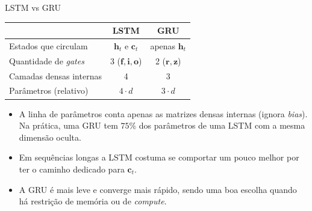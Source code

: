\documentclass[aspectratio=169,xcolor=dvipsnames]{beamer}
\begin{document}
\begin{frame}{LSTM vs GRU}
\centering
\begin{tabular}{l c c}
    \toprule
                                    & LSTM            & GRU \\
    \midrule
    Estados que circulam            & $\mathbf{h}_t$ e $\mathbf{c}_t$   & apenas $\mathbf{h}_t$ \\
    Quantidade de \textit{gates}    & 3 \quad ($\mathbf{f}, \mathbf{i}, \mathbf{o}$) & 2 \quad ($\mathbf{r}, \mathbf{z}$) \\
    Camadas densas internas         & 4               & 3 \\
    Parâmetros (relativo)           & $4 \cdot d$     & $3 \cdot d$ \\
    \bottomrule
\end{tabular}
\vspace{0.6em}
\begin{itemize}\footnotesize
    \item A linha de parâmetros conta apenas as matrizes densas internas (ignora \textit{bias}). Na prática, uma GRU tem $75\%$ dos parâmetros de uma LSTM com a mesma dimensão oculta.
    \item Em sequências longas a LSTM costuma se comportar um pouco melhor por ter o caminho dedicado para $\mathbf{c}_t$.
    \item A GRU é mais leve e converge mais rápido, sendo uma boa escolha quando há restrição de memória ou de \textit{compute}.
\end{itemize}
\end{frame}
\end{document}
